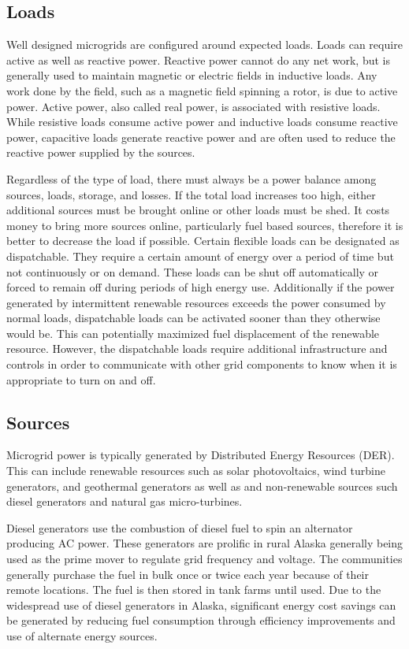 \subsection{Loads}
Well designed microgrids are configured around expected loads. Loads can require active as well as reactive power. Reactive power cannot do any net work, but is generally used to maintain magnetic or electric fields in inductive loads. Any work done by the field, such as a magnetic field spinning a rotor, is due to active power. Active power, also called real power, is associated with resistive loads. While resistive loads consume active power and inductive loads consume reactive power, capacitive loads generate reactive power and are often used to reduce the reactive power supplied by the sources. 

Regardless of the type of load, there must always be a power balance among sources, loads, storage, and losses. If the total load increases too high, either additional sources must be brought online or other loads must be shed. It costs money to bring more sources online, particularly fuel based sources, therefore it is better to decrease the load if possible. Certain flexible loads can be designated as dispatchable. They require a certain amount of energy over a period of time but not continuously or on demand. These loads can be shut off automatically or forced to remain off during periods of high energy use. Additionally if the power generated by intermittent renewable resources exceeds the power consumed by normal loads, dispatchable loads can be activated sooner than they otherwise would be. This can potentially maximized fuel displacement of the renewable resource. However, the dispatchable loads require additional infrastructure and controls in order to communicate with other grid components to know when it is appropriate to turn on and off.

\subsection{Sources}
Microgrid power is typically generated by Distributed Energy Resources (DER). This can include renewable resources such as solar photovoltaics, wind turbine generators, and geothermal generators as well as and non\--re\-new\-able sources such diesel generators and natural gas micro-turbines. 

Diesel generators use the combustion of diesel fuel to spin an alternator producing AC power. These generators are prolific in rural Alaska generally being used as the prime mover to regulate grid frequency and voltage. The communities  generally purchase the fuel in bulk once or twice each year because of their remote locations. The fuel is then stored in tank farms until used.
Due to the widespread use of diesel generators in Alaska, significant energy cost savings can be generated by reducing fuel consumption through efficiency improvements and use of alternate energy sources. 

